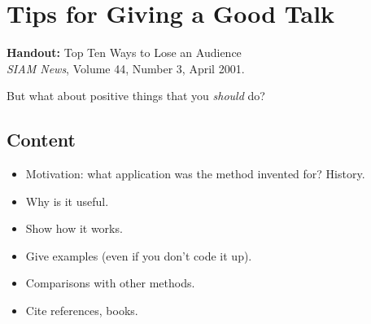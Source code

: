 \documentclass[12pt, a4paper]{article}
\theoremstyle{definition}
\theoremstyle{remark}
\numberwithin{equation}{section}
\begin{document}
%
%
%



\newpage
\section{Tips for Giving a Good Talk}

\textbf{Handout:} Top Ten Ways to Lose an Audience \\
\emph{SIAM News}, Volume 44, Number 3, April 2001.

But what about positive things that you \emph{should} do?
\subsection{Content}
\begin{itemize}
\item Motivation: what application was the method invented for? History.
\item Why is it useful.
\item Show how it works.
\item Give examples (even if you don't code it up).
\item Comparisons with other methods.
\item Cite references, books.
\end{itemize}
\end{document}
